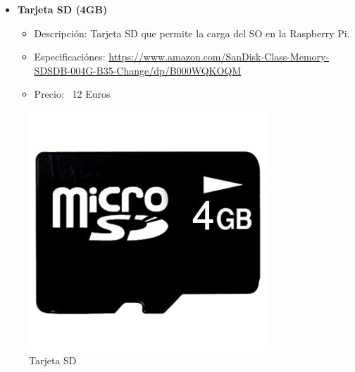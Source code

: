 \begin{itemize}
 \item \textbf{Tarjeta SD (4GB)}
 \begin{itemize}
  \item Descripción: Tarjeta SD que permite la carga del SO en la Raspberry Pi.
  \item Especificaciónes: \url{https://www.amazon.com/SanDisk-Class-Memory-SDSDB-004G-B35-Change/dp/B000WQKOQM}
  \item Precio: ~12 Euros
 \end{itemize}
\end{itemize}
\begin{figure}[!ht]
  \begin{center}
    \includegraphics[scale=0.10]{../images/hardware/sd.jpg}
    \caption{Tarjeta SD}
    \label{fig:tarjetasd}
  \end{center}
\end{figure}


